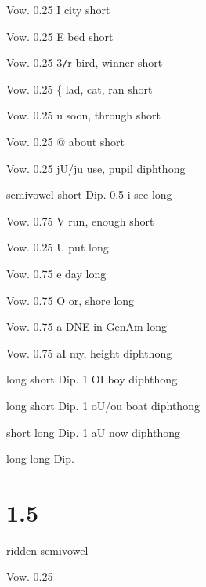 \documentclass[10pt,oneside]{memoir}
\def\mybibliostyle{plain}
\def\bibliocommand{}
\begin{document}
Vow.
0.25
I
city
short


Vow.
0.25
E
bed
short


Vow.
0.25
3\texttt{/}r
bird, winner
short


Vow.
0.25
\{
lad, cat, ran
short


Vow.
0.25
u
soon, through
short


Vow.
0.25
@
about
short


Vow.
0.25
jU/ju
use, pupil
diphthong


semivowel
short
Dip.
0.5
i
see
long


Vow.
0.75
V
run, enough
short


Vow.
0.25
U
put
long


Vow.
0.75
e
day
long


Vow.
0.75
O
or, shore
long


Vow.
0.75
a
DNE in GenAm
long


Vow.
0.75
aI
my, height
diphthong


long
short
Dip.
1
OI
boy
diphthong


long
short
Dip.
1
oU/ou
boat
diphthong


short
long
Dip.
1
aU
now
diphthong


long
long
Dip.


\part{1.5}
\label{}

ridden
semivowel


Vow.
0.25


%
%

\backmatter


\bibliocommand

\printglossary


\printindex
\end{document}
